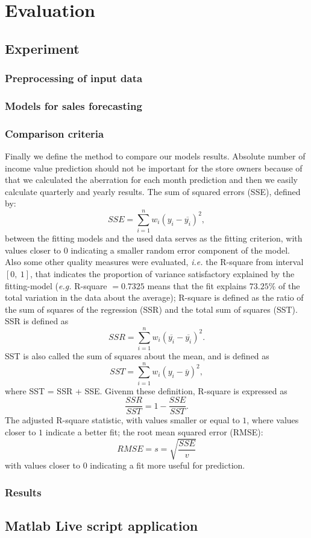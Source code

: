 
\chapter{Evaluation} \label{evaluation}
\section{Experiment} \label{sec:experiment}
\subsection{Preprocessing of input data} \label{subsec:preprocessing}
\subsection{Models for sales forecasting} \label{subsec:calculate_models}
\subsection{Comparison criteria} \label{subsec:result_metodology}
Finally we define the method to compare our models results.
Absolute number of income value prediction should not be important for the store owners because of that we calculated the aberration for each month
prediction and then we easily calculate quarterly and yearly results.
The sum of squared errors (SSE), defined by:
$$SSE = \sum^n_{i=1}w_i(y_i - \overline{y_i})^2,$$
between the fitting models and the used data serves as the fitting criterion,
with values closer to $0$ indicating a smaller random error component of the model.
Also some other quality measures were evaluated, \textit{i.e.} the R-square from interval $[0,\ 1]$,
that indicates the proportion of variance satisfactory explained by the fitting-model (\textit{e.g.}  R-square $= 0.7325$ means
that the fit explains $73.25\%$ of the total variation in the data about the average);
R-square is defined as the ratio of the sum of squares of the regression (SSR) and the total sum of squares (SST).
SSR is defined as
$$SSR = \sum_{i=1}^nw_i(\overline{y_i} - \overline{y_i})^2.$$
SST is also called the sum of squares about the mean, and is defined as
$$SST = \sum_{i=1}^nw_i(y_i - \overline{y})^2,$$
where SST = SSR + SSE. Givenm these definition, R-square is expressed as
$$\frac{SSR}{SST} = 1 - \frac{SSE}{SST}.$$
The adjusted R-square statistic, with values smaller or equal to $1$, where values closer to $1$ indicate a better fit; the root mean squared error (RMSE):\\
$$RMSE = s = \sqrt{\frac{SSE}{v}}$$
with values closer to $0$ indicating a fit more useful for prediction.
\subsection{Results} \label{subsec:experimentResults}
\section{Matlab Live script application} \label{sec:livescript}
